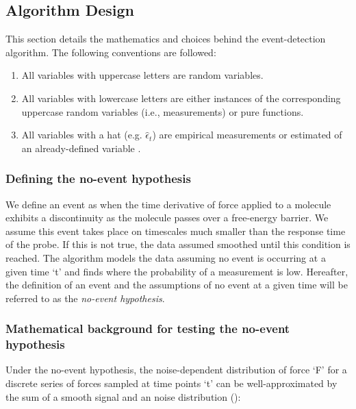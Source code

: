 \subsection{ Algorithm Design}

This section details the mathematics and choices behind the event-detection algorithm. The following conventions are followed:

\begin{enumerate}
 \item All variables with uppercase letters are random variables.
 \item All variables with lowercase letters are either instances of the corresponding uppercase random variables (i.e., measurements) or pure functions.
 \item All variables with a hat (e.g. $\hat{\epsilon}_t$) are empirical measurements or estimated of an already-defined variable .
\end{enumerate}

\subsubsection{Defining the no-event hypothesis}

\firstp We define an event as when the time derivative of force applied to a molecule exhibits a discontinuity as the molecule passes over a free-energy barrier. We assume this event takes place on timescales much smaller than the response time of the probe. If this is not true, the data assumed smoothed until this condition is reached. The algorithm models the data assuming no event is occurring at a given time `t' and finds where the probability of a measurement is low. Hereafter, the definition of an event and the assumptions of no event at a given time will be referred to as the \emph{no-event hypothesis}. 

\subsubsection{Mathematical background for testing the no-event hypothesis}

\firstp Under the no-event hypothesis, the noise-dependent distribution of force `F' for a discrete series of forces sampled at time points `t' can be well-approximated by the sum of a smooth signal and an noise distribution ():


